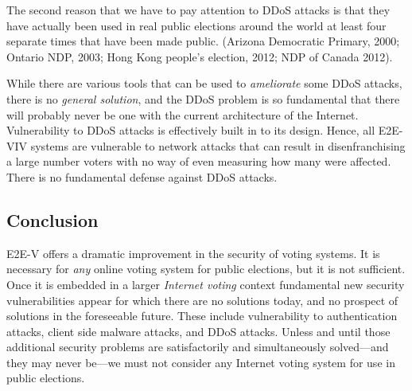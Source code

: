 The second reason that we have to pay attention to DDoS attacks is
that they have actually been used in real public elections around the
world at least four separate times that have been made
public. (Arizona Democratic Primary, 2000; Ontario NDP, 2003; Hong
Kong people's election, 2012; NDP of Canada 2012).

While there are various tools that can be used to \emph{ameliorate}
some DDoS attacks, there is no \emph{general solution}, and the DDoS
problem is so fundamental that there will probably never be one with
the current architecture of the Internet. Vulnerability to DDoS
attacks is effectively built in to its design. Hence, all E2E-VIV
systems are vulnerable to network attacks that can result in
disenfranchising a large number voters with no way of even measuring
how many were affected. There is no fundamental defense against DDoS
attacks.

\subsection{Conclusion}

E2E-V offers a dramatic improvement in the security of voting
systems. It is necessary for \emph{any} online voting system for
public elections, but it is not sufficient. Once it is embedded in a
larger \emph{Internet voting} context fundamental new security
vulnerabilities appear for which there are no solutions today, and no
prospect of solutions in the foreseeable future. These include
vulnerability to authentication attacks, client side malware attacks,
and DDoS attacks. Unless and until those additional security problems
are satisfactorily and simultaneously solved---and they may never
be---we must not consider any Internet voting system for use in public
elections.
